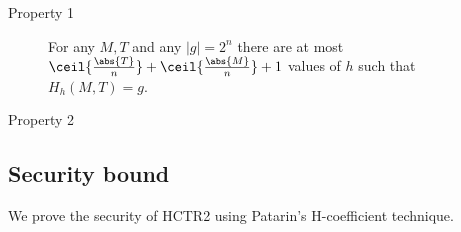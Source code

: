 \documentclass[letterpaper,11pt]{article}
\begin{document}
\begin{description}
    \item[Property 1] For any \(M, T\) and any \(|g| = 2^n\)
    there are at most \(\ceil{\frac{\abs{T}}{n}} + \ceil{\frac{\abs{M}}{n}} + 1\)
    values of \(h\) such that \(H_h(M, T) = g\).
    \item[Property 2] 
\end{description}

\subsection{Security bound}

We prove the security of HCTR2 using Patarin's H-coefficient technique. 

\printbibliography[heading=bibintoc]
\end{document}
